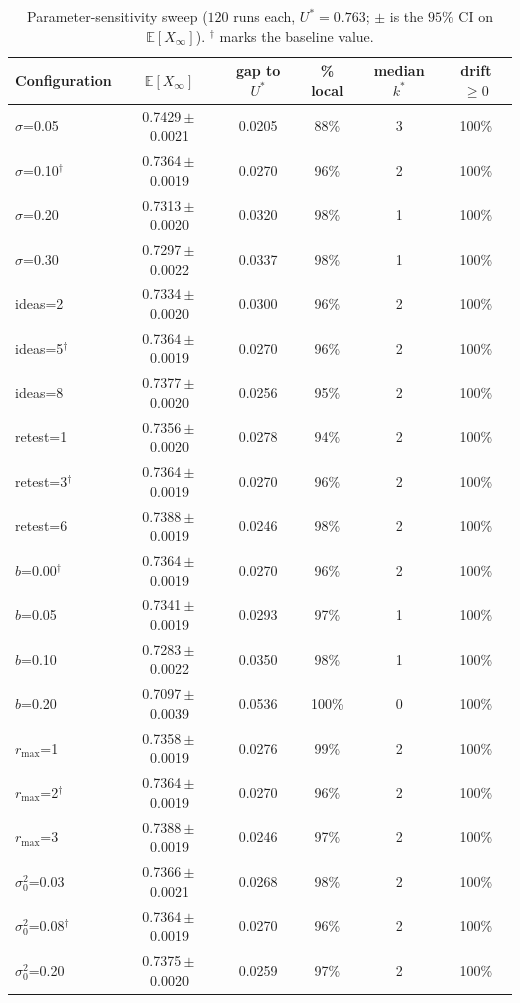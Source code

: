 \documentclass[11pt]{article}
\newcommand{\E}{\mathbb{E}}
\begin{document}
\begin{table}[h!]
\centering
\caption{Parameter-sensitivity sweep ($120$ runs each, $U^*=0.763$; $\pm$ is the $95\%$ CI on $\E[X_\infty]$). $^\dagger$ marks the baseline value.}
\label{tab:sens}
\footnotesize
\begin{tabular}{@{}lccccc@{}}
\toprule
\textbf{Configuration} & $\E[X_\infty]$ & gap to $U^*$ & \% local & median $k^*$ & drift $\ge0$ \\
\midrule
$\sigma$=0.05 & 0.7429\,$\pm$\,0.0021 & 0.0205 & 88\% & 3 & 100\% \\
$\sigma$=0.10$^\dagger$ & 0.7364\,$\pm$\,0.0019 & 0.0270 & 96\% & 2 & 100\% \\
$\sigma$=0.20 & 0.7313\,$\pm$\,0.0020 & 0.0320 & 98\% & 1 & 100\% \\
$\sigma$=0.30 & 0.7297\,$\pm$\,0.0022 & 0.0337 & 98\% & 1 & 100\% \\
\midrule
ideas=2 & 0.7334\,$\pm$\,0.0020 & 0.0300 & 96\% & 2 & 100\% \\
ideas=5$^\dagger$ & 0.7364\,$\pm$\,0.0019 & 0.0270 & 96\% & 2 & 100\% \\
ideas=8 & 0.7377\,$\pm$\,0.0020 & 0.0256 & 95\% & 2 & 100\% \\
\midrule
retest=1 & 0.7356\,$\pm$\,0.0020 & 0.0278 & 94\% & 2 & 100\% \\
retest=3$^\dagger$ & 0.7364\,$\pm$\,0.0019 & 0.0270 & 96\% & 2 & 100\% \\
retest=6 & 0.7388\,$\pm$\,0.0019 & 0.0246 & 98\% & 2 & 100\% \\
\midrule
$b$=0.00$^\dagger$ & 0.7364\,$\pm$\,0.0019 & 0.0270 & 96\% & 2 & 100\% \\
$b$=0.05 & 0.7341\,$\pm$\,0.0019 & 0.0293 & 97\% & 1 & 100\% \\
$b$=0.10 & 0.7283\,$\pm$\,0.0022 & 0.0350 & 98\% & 1 & 100\% \\
$b$=0.20 & 0.7097\,$\pm$\,0.0039 & 0.0536 & 100\% & 0 & 100\% \\
\midrule
$r_{\max}$=1 & 0.7358\,$\pm$\,0.0019 & 0.0276 & 99\% & 2 & 100\% \\
$r_{\max}$=2$^\dagger$ & 0.7364\,$\pm$\,0.0019 & 0.0270 & 96\% & 2 & 100\% \\
$r_{\max}$=3 & 0.7388\,$\pm$\,0.0019 & 0.0246 & 97\% & 2 & 100\% \\
\midrule
$\sigma_0^2$=0.03 & 0.7366\,$\pm$\,0.0021 & 0.0268 & 98\% & 2 & 100\% \\
$\sigma_0^2$=0.08$^\dagger$ & 0.7364\,$\pm$\,0.0019 & 0.0270 & 96\% & 2 & 100\% \\
$\sigma_0^2$=0.20 & 0.7375\,$\pm$\,0.0020 & 0.0259 & 97\% & 2 & 100\% \\
\bottomrule
\end{tabular}
\end{table}
\end{document}
